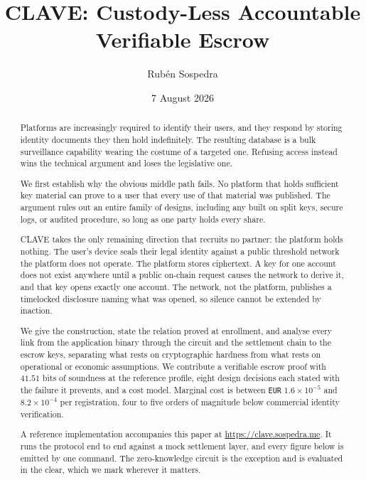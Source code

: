\documentclass[11pt,a4paper]{article}
\title{CLAVE: Custody-Less Accountable Verifiable Escrow}
\author{Rub\'en Sospedra}
\date{7 August 2026}
\begin{document}
\maketitle

\begin{abstract}
Platforms are increasingly required to identify their users, and they respond by
storing identity documents they then hold indefinitely. The resulting database is
a bulk surveillance capability wearing the costume of a targeted one. Refusing
access instead wins the technical argument and loses the legislative one.

We first establish why the obvious middle path fails. No platform that holds
sufficient key material can prove to a user that every use of that material was
published. The argument rules out an entire family of designs, including any
built on split keys, secure logs, or audited procedure, so long as one party
holds every share.

CLAVE takes the only remaining direction that recruits no partner: the platform
holds nothing. The user's device seals their legal identity against a public
threshold network the platform does not operate. The platform stores ciphertext.
A key for one account does not exist anywhere until a public on-chain request
causes the network to derive it, and that key opens exactly one account. The
network, not the platform, publishes a timelocked disclosure naming what was
opened, so silence cannot be extended by inaction.

We give the construction, state the relation proved at enrollment, and analyse
every link from the application binary through the circuit and the settlement
chain to the escrow keys, separating what rests on cryptographic hardness from
what rests on operational or economic assumptions. We contribute a verifiable
escrow proof with $41.51$ bits of soundness at the reference profile, eight
design decisions each stated with the failure it prevents, and a cost model.
Marginal cost is between \texttt{EUR} $1.6 \times 10^{-5}$ and
$8.2 \times 10^{-4}$ per registration, four to five orders of magnitude below
commercial identity verification.

A reference implementation accompanies this paper at
\url{https://clave.sospedra.me}. It runs the protocol end to end against a
mock settlement layer, and every figure below is emitted by one command. The
zero-knowledge circuit is the exception and is evaluated in the clear, which we
mark wherever it matters.
\end{abstract}
\end{document}
